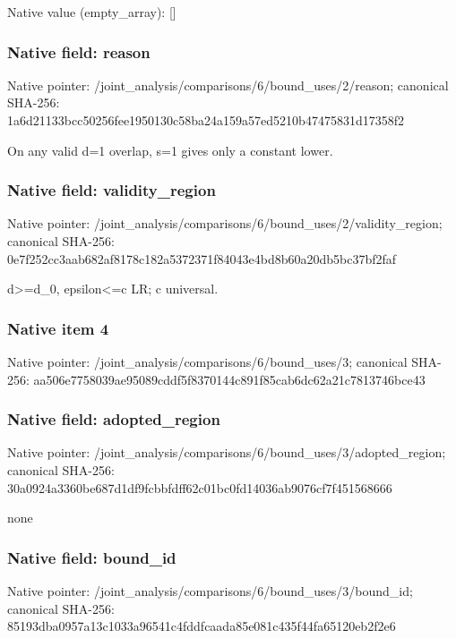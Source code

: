 \documentclass[10pt,a4paper]{article}
\begin{document}
Native value (empty\_\allowbreak{}array): []

\subsubsection{Native field: reason}
Native pointer: /joint\_\allowbreak{}analysis/comparisons/6/bound\_\allowbreak{}uses/2/reason; canonical SHA-256: 1a6d21133bcc50256fee1950130c58ba24a159a57ed5210b47475831d17358f2

\begingroup\raggedright\sloppy On any valid d=\allowbreak{}1 overlap,\allowbreak{} s=\allowbreak{}1 gives only a constant lower.\par\endgroup

\subsubsection{Native field: validity\_\allowbreak{}region}
Native pointer: /joint\_\allowbreak{}analysis/comparisons/6/bound\_\allowbreak{}uses/2/validity\_\allowbreak{}region; canonical SHA-256: 0e7f252cc3aab682af8178c182a5372371f84043e4bd8b60a20db5bc37bf2faf

\begingroup\raggedright\sloppy d>=\allowbreak{}d\_\allowbreak{}0,\allowbreak{} epsilon<=\allowbreak{}c LR;\allowbreak{} c universal.\par\endgroup

\subsubsection{Native item 4}
Native pointer: /joint\_\allowbreak{}analysis/comparisons/6/bound\_\allowbreak{}uses/3; canonical SHA-256: aa506e7758039ae95089cddf5f8370144c891f85cab6dc62a21c7813746bce43

\subsubsection{Native field: adopted\_\allowbreak{}region}
Native pointer: /joint\_\allowbreak{}analysis/comparisons/6/bound\_\allowbreak{}uses/3/adopted\_\allowbreak{}region; canonical SHA-256: 30a0924a3360be687d1df9fcbbfdff62c01bc0fd14036ab9076cf7f451568666

\begingroup\raggedright\sloppy none\par\endgroup

\subsubsection{Native field: bound\_\allowbreak{}id}
Native pointer: /joint\_\allowbreak{}analysis/comparisons/6/bound\_\allowbreak{}uses/3/bound\_\allowbreak{}id; canonical SHA-256: 85193dba0957a13c1033a96541c4fddfcaada85e081c435f44fa65120eb2f2e6
\end{document}
